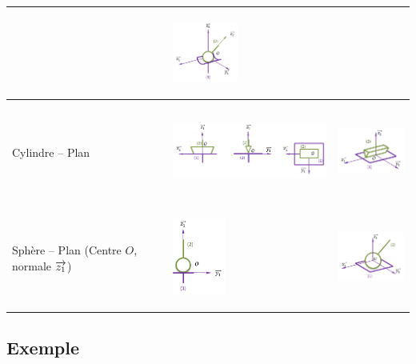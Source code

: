 \documentclass[10pt,oneside]{article}
\begin{document}
\begin{center}
\begin{tabular}{|m{}|p{}|p{}|}
&
\begin{center}
\includegraphics[height=2cm]{png/annulaire_3d}
\end{center}\\\hline
Cylindre -- Plan&
\begin{center}
\includegraphics[height=2.5cm]{png/rectiligne_2d}
\end{center}
&
\begin{center}
\includegraphics[height=2cm]{png/rectiligne_3d}
\end{center}\\\hline
Sphère -- Plan
(Centre $O$, normale $\overrightarrow{z_1}$)
&
\begin{center}
\includegraphics[height=2.5cm]{png/ponctuelle_2d}
\end{center}
&
\begin{center}
\includegraphics[height=2cm]{png/ponctuelle_3d}
\end{center}\\\hline
\end{tabular}
\end{center}

\subsection{Exemple}
\end{document}
